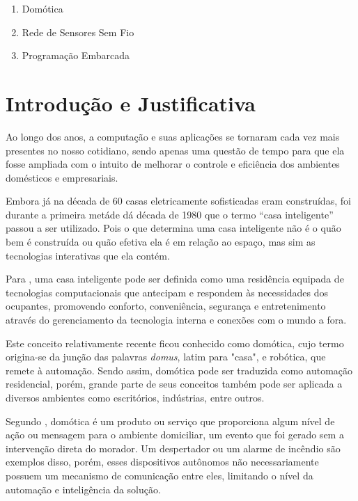 \documentclass[
    12pt,               %
    a4paper,            %
    english,            %
    brazil,             %
    ]{article}
\begin{document}
        \begin{enumerate}
            \item Domótica
			\item Rede de Sensores Sem Fio
			\item Programação Embarcada
        \end{enumerate}


\section{Introdução e Justificativa}
Ao longo dos anos, a computação e suas aplicações se tornaram cada vez mais presentes no nosso cotidiano, sendo apenas uma questão
de tempo para que ela fosse ampliada com o intuito de melhorar o controle e eficiência dos ambientes domésticos e empresariais.

Embora já na década de 60 casas eletricamente sofisticadas eram construídas, foi durante a primeira metáde dá década de 1980 que o
termo  ``casa inteligente'' passou a ser utilizado. Pois o que determina uma casa inteligente não é o quão bem é construída ou
quão efetiva ela é em relação ao espaço, mas sim as tecnologias interativas que ela contém. \cite{harper2003}

Para , uma casa inteligente pode ser definida como uma residência equipada de tecnologias computacionais
que antecipam e respondem às necessidades dos ocupantes, promovendo conforto, conveniência, segurança e entretenimento através do
gerenciamento da tecnologia interna e conexões com o mundo a fora.

Este conceito relativamente recente ficou conhecido como domótica, cujo termo origina-se da junção das palavras \textit{domus},
latim para "casa", e robótica, que remete à automação. Sendo assim, domótica pode ser traduzida como automação residencial, porém,
grande parte de seus conceitos também pode ser aplicada a diversos ambientes como escritórios, indústrias, entre outros.

Segundo , domótica é um produto ou serviço que proporciona algum nível de ação ou mensagem para o ambiente
domiciliar, um evento que foi gerado sem a intervenção direta do morador. Um despertador ou um alarme de incêndio são exemplos
disso, porém, esses dispositivos autônomos não necessariamente possuem um mecanismo de comunicação entre eles, limitando o nível
da automação e inteligência da solução.
\end{document}
